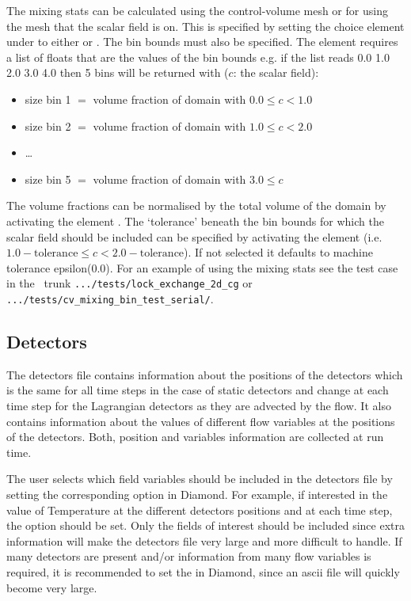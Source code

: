 The mixing stats can be calculated using the control-volume mesh or for \Poo using the mesh that the scalar field is on. This is specified by setting the choice element under  to either  or . The bin bounds must also be specified.  The element  requires a list of floats that are the values of the bin bounds e.g. if the list reads 0.0 1.0 2.0 3.0 4.0 then 5 bins will be returned with ($c$: the scalar field):
\begin{itemize}
\item size bin 1 $=$ volume fraction of domain with $0.0\leq c < 1.0$
\item size bin 2 $=$ volume fraction of domain with $1.0\leq c < 2.0$
\item \ldots 
\item size bin 5 $=$ volume fraction of domain with $3.0\leq c$
\end{itemize}

The volume fractions can be normalised by the total volume of the domain by activating the element . The `tolerance' beneath the bin bounds for which the scalar field should be included can be specified by activating the element  (i.e. $1.0-\mathrm{tolerance} \leq c < 2.0-\mathrm{tolerance}$). If not selected it defaults to machine tolerance epsilon(0.0). For an example of using the mixing stats see the test case in the \fluidity\ trunk \lstinline[language = bash]+.../tests/lock_exchange_2d_cg+ or \lstinline[language = bash]+.../tests/cv_mixing_bin_test_serial/+.

\subsection{Detectors}
\label{sect:diagnostics_detectors}
The detectors file contains information about the positions of the detectors which is the same for all time steps in the case of static detectors and change at each time step for the Lagrangian detectors as they are advected by the flow. It also contains information about the values of different flow variables at the positions of the detectors. Both, position and variables information are collected at run time.

The user selects which field variables should be included in the detectors file by setting the corresponding option in Diamond. For example, if interested in the value of Temperature at the different detectors positions and at each time step, the option   should be set. Only the fields of interest should be included since extra information will make the detectors file very large and more difficult to handle. If many detectors are present and/or information from many flow variables is required, it is recommended to set the  in Diamond, since an ascii file will quickly become very large.


